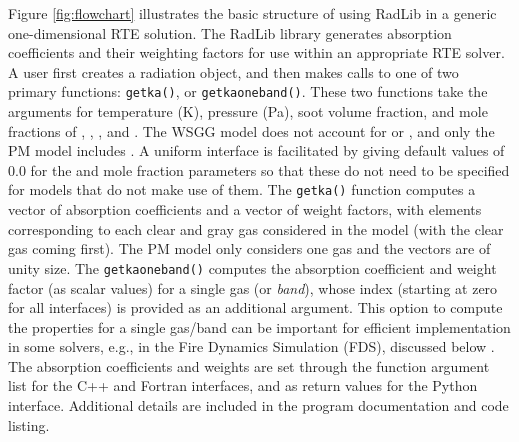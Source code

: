 \documentclass[preprint,12pt]{elsarticle}
\begin{document}
Figure \ref{fig:flowchart} illustrates the basic structure of using RadLib in a generic one-dimensional RTE solution. The RadLib library generates absorption coefficients and their weighting factors for use within an appropriate RTE solver. A user first creates a radiation object, and then makes calls to one of two primary functions: \texttt{get\textunderscore k\textunderscore a()}, or \texttt{get\textunderscore k\textunderscore a\textunderscore oneband()}.
These two functions take the arguments for temperature (K), pressure (Pa), soot volume fraction, and mole fractions of , , , and . The WSGG model does not account for  or , and only the PM model includes . A uniform interface is facilitated by giving default values of 0.0 for the  and  mole fraction parameters so that these do not need to be specified for models that do not make use of them. The \texttt{get\textunderscore k\textunderscore a()} function computes a vector of absorption coefficients and a vector of weight factors, with elements corresponding to each clear and gray gas considered in the model (with the clear gas coming first). The PM model only considers one gas and the vectors are of unity size. The \texttt{get\textunderscore k\textunderscore a\textunderscore oneband()} computes the absorption coefficient and weight factor (as scalar values) for a single gas (or \emph{band}), whose index (starting at zero for all interfaces) is provided as an additional argument. This option to compute the properties for a single gas/band can be important for efficient implementation in some solvers, e.g., in the Fire Dynamics Simulation (FDS), discussed below \cite{FDS}. The absorption coefficients and weights are set through the function argument list for the C++ and Fortran interfaces, and as return values for the Python interface. Additional details are included in the program documentation and code listing.
%
\end{document}
